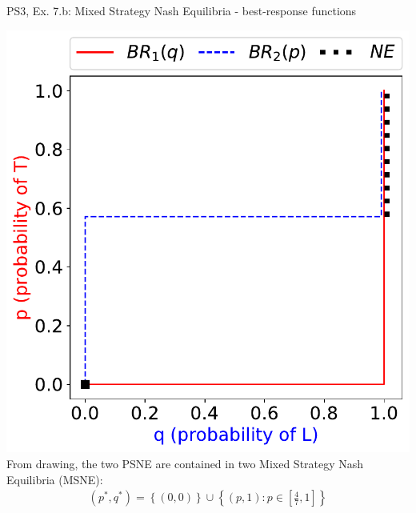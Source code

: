 \begin{frame}{PS3, Ex. 7.b: Mixed Strategy Nash Equilibria - best-response functions}
\begin{multicols}{2}
    \includegraphics[width=\columnwidth]{figures/5b2}
    From drawing, the two PSNE are contained in two Mixed Strategy Nash Equilibria (MSNE):
    \begin{align*}
      (p^{*},q^{*})=\left\{(0,0)\right\}\cup\left\{(p,1):p\in\left[\frac{4}{7},1\right]\right\}
    \end{align*}
  \vfill\null
  \end{multicols}
\end{frame}

